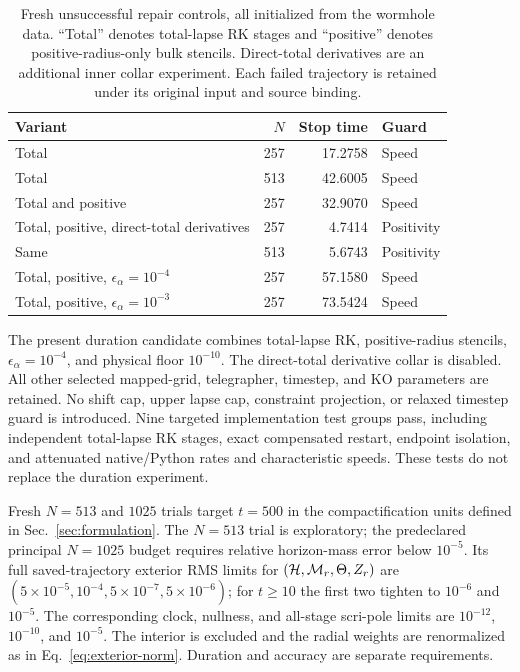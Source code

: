 \begin{table}[tbp]
\caption{Fresh unsuccessful repair controls, all initialized from the wormhole data. ``Total'' denotes total-lapse RK stages and ``positive'' denotes positive-radius-only bulk stencils. Direct-total derivatives are an additional inner collar experiment. Each failed trajectory is retained under its original input and source binding.}
\label{tab:repair-controls}
\begin{ruledtabular}
\begin{tabular}{p{9.2cm}rrl}
Variant & $N$ & Stop time & Guard\\
\hline
Total &257&17.2758&Speed\\
Total &513&42.6005&Speed\\
Total and positive &257&32.9070&Speed\\
Total, positive, direct-total derivatives &257&4.7414&Positivity\\
Same &513&5.6743&Positivity\\
Total, positive, $\epsilon_\alpha=10^{-4}$ &257&57.1580&Speed\\
Total, positive, $\epsilon_\alpha=10^{-3}$ &257&73.5424&Speed
\end{tabular}
\end{ruledtabular}
\end{table}

The present duration candidate combines total-lapse RK, positive-radius stencils, $\epsilon_\alpha=10^{-4}$, and physical floor $10^{-10}$. The direct-total derivative collar is disabled. All other selected mapped-grid, telegrapher, timestep, and KO parameters are retained. No shift cap, upper lapse cap, constraint projection, or relaxed timestep guard is introduced. Nine targeted implementation test groups pass, including independent total-lapse RK stages, exact compensated restart, endpoint isolation, and attenuated native/Python rates and characteristic speeds. These tests do not replace the duration experiment.

Fresh $N=513$ and $1025$ trials target $t=500$ in the compactification units defined in Sec.~\ref{sec:formulation}. The $N=513$ trial is exploratory; the predeclared principal $N=1025$ budget requires relative horizon-mass error below $10^{-5}$. Its full saved-trajectory exterior RMS limits for $(\mathcal H,\mathcal M_r,\Theta,Z_r)$ are $(5\times10^{-5},10^{-4},5\times10^{-7},5\times10^{-6})$; for $t\geq10$ the first two tighten to $10^{-6}$ and $10^{-5}$. The corresponding clock, nullness, and all-stage scri-pole limits are $10^{-12}$, $10^{-10}$, and $10^{-5}$. The interior is excluded and the radial weights are renormalized as in Eq.~\eqref{eq:exterior-norm}. Duration and accuracy are separate requirements.

